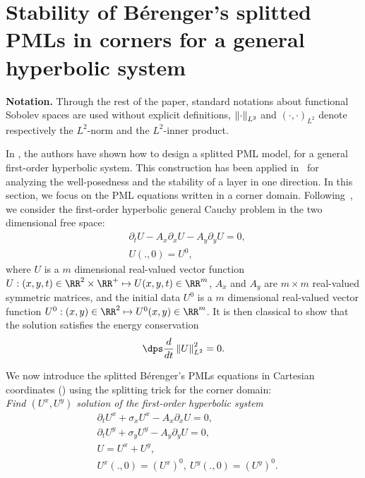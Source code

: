 \documentclass[a4paper]{article}
\begin{document}
\section{Stability of B\'erenger's splitted PMLs in corners for a
general hyperbolic system}\label{sec:2}

{\bf Notation.} Through the rest of the paper,  standard notations 
about functional Sobolev spaces 
are used without explicit definitions, 
$\left\|\cdot\right\|_{L^2}$ and $(\cdot,\cdot)_{L^2}$ denote respectively the $L^{2}$-norm and the $L^{2}$-inner product.

In \cite{Col-Tso2}, the authors have shown how to design a splitted PML 
model, for a general first-order hyperbolic system. This construction 
has been applied in~\cite{BFJ:2003} for analyzing the well-posedness and 
the stability of a layer in one direction. In this section, we focus on 
the PML equations written in a corner domain. Following~\cite{Col-Tso2,BFJ:2003}, 
we consider the  first-order hyperbolic general Cauchy problem in the two 
dimensional free space:
\begin{align*}
& \partial_{t}  U-A_{x}\partial_{x}U-A_{y}\partial_{y}U=0,\\
&U(.,0)=U^{0},
\end{align*} 
where $U$ is a $m$ dimensional real-valued vector function 
$U:(x,y,t)\in \RR^2 \times \RR^+ \mapsto U(x,y,t) \in \RR^m$, 
$A_{x}$ and $A_{y}$  are $m \times m$ real-valued  symmetric matrices, 
and the initial data $U^{0}$ is a $m$ dimensional real-valued vector 
function $U^0: (x,y)\in \RR^2 \mapsto U^0(x,y) \in \RR^m$. 
It is then classical to show that the solution satisfies the energy conservation 
\[
\dps \frac{d}{dt}\norma{U}_{L^2}^2=0.
\]

We now introduce the splitted B\'erenger's PMLs equations in Cartesian
coordinates (\cite{Ber94,Col-Tso2}) using the splitting trick
for the corner domain: \\
{\it Find $(U^{x},U^{y})$ solution of the first-order hyperbolic system}
\begin{align}
\label{eq:pml_corner_1}& \partial_{t} U^{x}+\sigma_{x}U^{x}-A_{x}\partial_{x}U=0,
\\
\label{eq:pml_corner_2}&\partial_{t} U^{y}+\sigma_{y}U^{y}-A_{y}\partial_{y}U=0,
\\
\label{eq:pml_corner_3}&U=U^{x}+U^{y},
\\
\label{eq:pml_corner_4}& U^{x}(.,0)=(U^{x})^{0},\ U^{y}(.,0)=(U^{y})^{0}.
\end{align}
\end{document}
